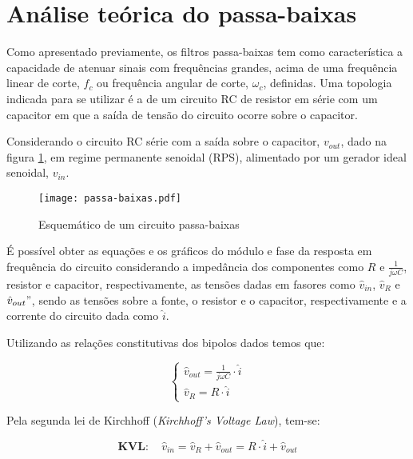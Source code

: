 \section{Análise teórica do passa-baixas}\label{sec:analise-teorica-do-passa-baixas}
  Como apresentado previamente, os filtros passa-baixas tem como característica a capacidade de atenuar sinais com frequências grandes, acima de uma frequência linear de corte, $f_c$ ou frequência angular de corte, $\omega_c$, definidas. Uma topologia indicada para se utilizar é a de um circuito RC de resistor em série com um capacitor em que a saída de tensão do circuito ocorre sobre o capacitor.

  Considerando o circuito RC série com a saída sobre o capacitor, $v_{out}$, dado na figura \ref{fig:esquematico_passa_baixas}, em regime permanente senoidal (RPS), alimentado por um gerador ideal senoidal, $v_{in}$.

  \begin{figure}[H]
    \caption{Esquemático de um circuito passa-baixas}
    \texttt{[image: passa-baixas.pdf]}
    \label{fig:esquematico_passa_baixas}
  \end{figure}

  É possível obter as equações e os gráficos do módulo e fase da resposta em frequência do circuito considerando a impedância dos componentes como $R$ e $\frac{1}{j \omega C}$, resistor e capacitor, respectivamente, as tensões dadas em fasores como $\hat{v}_{in}$, $\hat{v}_{R}$ e $\hat{v}_{out}"$, sendo as tensões sobre a fonte, o resistor e o capacitor, respectivamente e a corrente do circuito dada como $\hat{i}$.

  Utilizando as relações constitutivas dos bipolos dados temos que:

  \begin{equation*}
    \begin{cases}
      \hat{v}_{out} = \frac{1}{j \omega C} \cdot \hat{i} \\
      \hat{v}_{R} = R \cdot \hat{i}
    \end{cases}
  \end{equation*}

  Pela segunda lei de Kirchhoff (\textit{Kirchhoff's Voltage Law}), tem-se:

  \begin{equation} 
    \mathbf{KVL:} \quad \hat{v}_{in} = \hat{v}_{R} + \hat{v}_{out} = R \cdot \hat{i} + \hat{v}_{out}
    \label{eq:kvl_passa_baixas}
  \end{equation}

